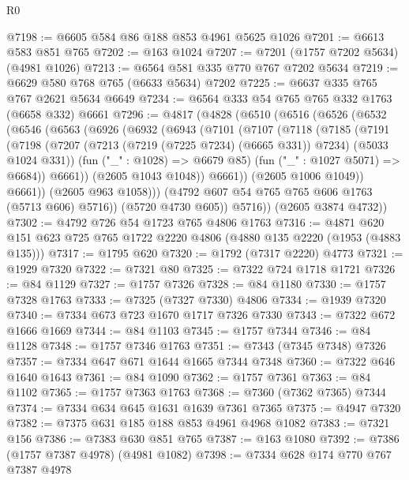 \begin{lexlean}{R0}
\begin{coremodule}
@7198 := @6605 @584 @86 @188 @853 @4961 @5625 @1026
@7201 := @6613 @583 @851 @765
@7202 := @163 @1024
@7207 := @7201 (@1757 @7202 @5634) (@4981 @1026)
@7213 := @6564 @581 @335 @770 @767 @7202 @5634
@7219 := @6629 @580 @768 @765 (@6633 @5634) @7202
@7225 := @6637 @335 @765 @767 @2621 @5634 @6649
@7234 := @6564 @333 @54 @765 @765 @332 @1763 (@6658 @332) @6661
@7296 := @4817
    (@4828
      (@6510
        (@6516
          (@6526
            (@6532
              (@6546
                (@6563
                  (@6926
                    (@6932
                      (@6943
                        (@7101
                          (@7107
                            (@7118
                              (@7185
                                (@7191
                                  (@7198
                                    (@7207
                                      (@7213 (@7219 (@7225 @7234) (@6665 @331)) @7234)
                                      (@5033 @1024 @331))
                                    (fun ("_" : @1028) => @6679 @85)
                                    (fun ("_" : @1027 @5071) => @6684))
                                  @6661))
                              (@2605 @1043 @1048))
                            @6661))
                        (@2605 @1006 @1049))
                      @6661))
                  (@2605 @963 @1058)))
              (@4792 @607 @54 @765 @765 @606 @1763 (@5713 @606) @5716))
            (@5720 @4730 @605))
          @5716))
      (@2605 @3874 @4732))
@7302 := @4792 @726 @54 @1723 @765 @4806 @1763
@7316 := @4871 @620 @151 @623 @725 @765 @1722 @2220 @4806 (@4880 @135 @2220 (@1953 (@4883 @135)))
@7317 := @1795 @620
@7320 := @1792 (@7317 @2220) @4773
@7321 := @1929 @7320
@7322 := @7321 @80
@7325 := @7322 @724 @1718 @1721
@7326 := @84 @1129
@7327 := @1757 @7326
@7328 := @84 @1180
@7330 := @1757 @7328 @1763
@7333 := @7325 (@7327 @7330) @4806
@7334 := @1939 @7320
@7340 := @7334 @673 @723 @1670 @1717 @7326 @7330
@7343 := @7322 @672 @1666 @1669
@7344 := @84 @1103
@7345 := @1757 @7344
@7346 := @84 @1128
@7348 := @1757 @7346 @1763
@7351 := @7343 (@7345 @7348) @7326
@7357 := @7334 @647 @671 @1644 @1665 @7344 @7348
@7360 := @7322 @646 @1640 @1643
@7361 := @84 @1090
@7362 := @1757 @7361
@7363 := @84 @1102
@7365 := @1757 @7363 @1763
@7368 := @7360 (@7362 @7365) @7344
@7374 := @7334 @634 @645 @1631 @1639 @7361 @7365
@7375 := @4947 @7320
@7382 := @7375 @631 @185 @188 @853 @4961 @4968 @1082
@7383 := @7321 @156
@7386 := @7383 @630 @851 @765
@7387 := @163 @1080
@7392 := @7386 (@1757 @7387 @4978) (@4981 @1082)
@7398 := @7334 @628 @174 @770 @767 @7387 @4978

\end{coremodule}
\end{lexlean}
